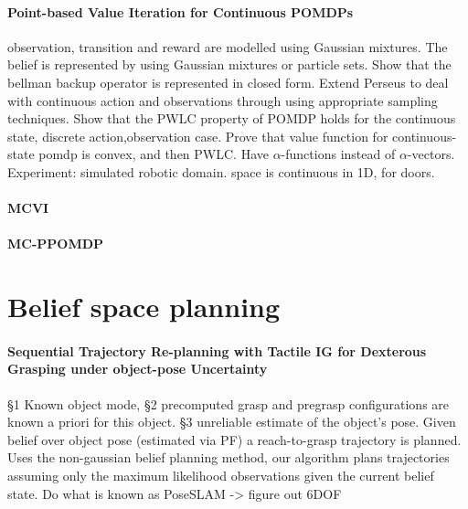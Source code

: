 \documentclass[review]{elsarticle}
\begin{document}
\paragraph{Point-based Value Iteration for Continuous POMDPs}

\cite{PBVI_C_2006}

observation, transition and reward are modelled using Gaussian mixtures. The belief is 
represented by using Gaussian mixtures or particle sets. Show that the bellman backup
operator is represented in closed form. Extend Perseus to deal with continuous action 
and observations through using appropriate sampling techniques. Show that the PWLC
property of POMDP holds for the continuous state, discrete action,observation case.
Prove that value function for continuous-state pomdp is convex, and then PWLC.
Have $\alpha$-functions instead of $\alpha$-vectors. Experiment: simulated robotic domain.
space is continuous in 1D, for doors. 

\paragraph{MCVI}

\cite{MCVI_CS_POMDPs}

\paragraph{MC-PPOMDP}

\cite{mc_update_ppomdps}


\section{Belief space planning}






\paragraph{Sequential Trajectory Re-planning with Tactile IG for Dexterous Grasping under object-pose Uncertainty}

§1 Known object mode, §2 precomputed grasp and pregrasp configurations are known a priori for this object. §3 unreliable estimate of the object's pose.
Given belief over object pose (estimated via PF) a reach-to-grasp trajectory is planned. 
Uses the non-gaussian belief planning method, our algorithm plans trajectories assuming only the maximum likelihood observations given the current belief state.
Do what is known as PoseSLAM -> figure out 6DOF 
\end{document}
